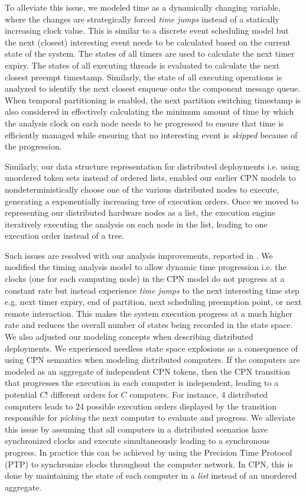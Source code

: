 To alleviate this issue, we modeled time as a dynamically changing variable, where the changes are strategically forced \emph{time jumps} instead of a statically increasing clock value. This is similar to a discrete event scheduling model but the next (closest) interesting event needs to be calculated based on the current state of the system. The states of all timers are used to calculate the next timer expiry. The states of all executing threads is evaluated to calculate the next closest preempt timestamp. Similarly, the state of all executing operations is analyzed to identify the next closest enqueue onto the component message queue. When temporal partitioning is enabled, the next partition switching timestamp is also considered in effectively calculating the minimum amount of time by which the analysis clock on each node needs to be progressed to ensure that time is efficiently managed while ensuring that no interesting event is \emph{skipped} because of the progression.

Similarly, our data structure representation for distributed deployments i.e. using unordered token sets instead of ordered lists, enabled our earlier CPN models to nondeterministically choose one of the various distributed nodes to execute, generating a exponentially increasing tree of execution orders. Once we moved to representing our distributed hardware nodes as a list, the execution engine iteratively executing the analysis on each node in the list, leading to one execution order instead of a tree. 

Such issues are resolved with our analysis improvements, reported in \cite{SEUS}. We modified the timing analysis model to allow dynamic time progression i.e. the clocks (one for each computing node) in the CPN model do not progress at a constant rate but instead experience \emph{time jumps} to the next interesting time step e.g. next timer expiry, end of partition, next scheduling preemption point, or next remote interaction. This makes the system execution progress at a much higher rate and reduces the overall number of states being recorded in the state space. We also adjusted our modeling concepts when describing distributed deployments. We experienced needless state space explosions as a consequence of using CPN semantics when modeling distributed computers. If the computers are modeled as an aggregate of independent CPN tokens, then the CPN transition that progresses the execution in each computer is independent, leading to a potential $C!$ different orders for $C$ computers. For instance, 4 distributed computers leads to 24 possible execution orders displayed by the transition responsible for \emph{picking} the next computer to evaluate and progress. We alleviate this issue by assuming that all computers in a distributed scenarios have synchronized clocks and execute simultaneously leading to a synchronous progress. In practice this can be achieved by using the Precision Time Protocol (PTP) \cite{correll2005design} to synchronize clocks throughout the computer network. In CPN, this is done by maintaining the state of each computer in a \emph{list} instead of an unordered aggregate. 

